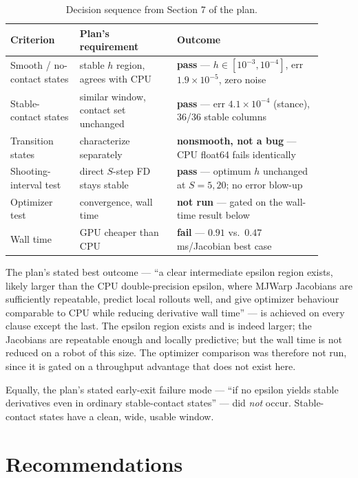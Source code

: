 \documentclass[11pt,a4paper]{article}
\begin{document}
\begin{table}[htbp]
\centering
\footnotesize
\caption{Decision sequence from Section 7 of the plan.}
\label{tab:decision}
\begin{tabular}{p{0.20\linewidth}p{0.28\linewidth}p{0.42\linewidth}}
\toprule
\textbf{Criterion} & \textbf{Plan's requirement} & \textbf{Outcome} \\
\midrule
Smooth / no-contact states & stable $h$ region, agrees with CPU & \textbf{pass} --- $h\in[10^{-3},10^{-4}]$, err $1.9\times10^{-5}$, zero noise \\
Stable-contact states & similar window, contact set unchanged & \textbf{pass} --- err $4.1\times10^{-4}$ (stance), 36/36 stable columns \\
Transition states & characterize separately & \textbf{nonsmooth, not a bug} --- CPU float64 fails identically \\
Shooting-interval test & direct $S$-step FD stays stable & \textbf{pass} --- optimum $h$ unchanged at $S=5,20$; no error blow-up \\
Optimizer test & convergence, wall time & \textbf{not run} --- gated on the wall-time result below \\
Wall time & GPU cheaper than CPU & \textbf{fail} --- $0.91$ vs.\ $0.47$\,ms/Jacobian best case \\
\bottomrule
\end{tabular}
\end{table}

The plan's stated best outcome --- ``a clear intermediate epsilon region exists,
likely larger than the CPU double-precision epsilon, where MJWarp Jacobians are sufficiently
repeatable, predict local rollouts well, and give optimizer behaviour comparable to CPU while
reducing derivative wall time'' --- is achieved on every clause except the last. The epsilon
region exists and is indeed larger; the Jacobians are repeatable enough and locally
predictive; but the wall time is not reduced on a robot of this size. The optimizer
comparison was therefore not run, since it is gated on a throughput advantage that does not
exist here.

Equally, the plan's stated early-exit failure mode --- ``if no epsilon yields stable
derivatives even in ordinary stable-contact states'' --- did \emph{not} occur. Stable-contact
states have a clean, wide, usable window.

\section{Recommendations}
\end{document}
